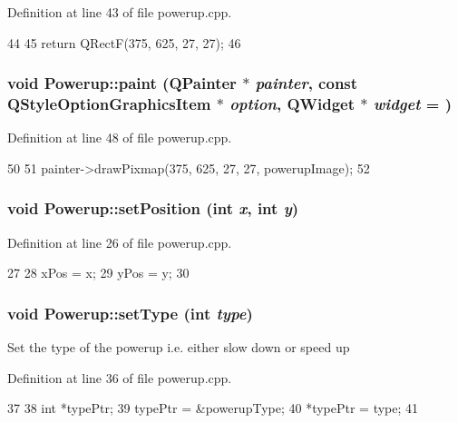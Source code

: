 Definition at line 43 of file powerup.cpp.


\begin{DoxyCode}
44 {
45     return QRectF(375, 625, 27, 27);
46 }
\end{DoxyCode}
\hypertarget{class_powerup_af9b71984dff4762bd0d5316375a0db36}{
\subsubsection[{paint}]{\setlength{\rightskip}{0pt plus 5cm}void Powerup::paint (QPainter $\ast$ {\em painter}, \/  const QStyleOptionGraphicsItem $\ast$ {\em option}, \/  QWidget $\ast$ {\em widget} = {})}}
\label{class_powerup_af9b71984dff4762bd0d5316375a0db36}


Definition at line 48 of file powerup.cpp.


\begin{DoxyCode}
50 {
51     painter->drawPixmap(375, 625, 27, 27, powerupImage);
52 }
\end{DoxyCode}
\hypertarget{class_powerup_a2a2f3e03678ec74cfcd0e255508da424}{
\subsubsection[{setPosition}]{\setlength{\rightskip}{0pt plus 5cm}void Powerup::setPosition (int {\em x}, \/  int {\em y})}}
\label{class_powerup_a2a2f3e03678ec74cfcd0e255508da424}


Definition at line 26 of file powerup.cpp.


\begin{DoxyCode}
27 {
28     xPos = x;
29     yPos = y;
30 }
\end{DoxyCode}
\hypertarget{class_powerup_a61e9a00b5146933a34dec31eeab2bd64}{
\subsubsection[{setType}]{\setlength{\rightskip}{0pt plus 5cm}void Powerup::setType (int {\em type})}}
\label{class_powerup_a61e9a00b5146933a34dec31eeab2bd64}
Set the type of the powerup i.e. either slow down or speed up 

Definition at line 36 of file powerup.cpp.


\begin{DoxyCode}
37 {
38     int *typePtr;
39     typePtr = &powerupType;
40     *typePtr = type;
41 }
\end{DoxyCode}


